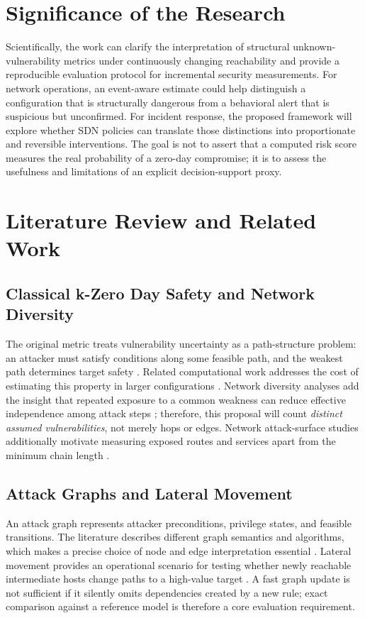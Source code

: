 \documentclass[12pt,a4paper,oneside]{article}
\begin{document}
\section{Significance of the Research}\label{sec:significance}
Scientifically, the work can clarify the interpretation of structural unknown-vulnerability metrics under continuously changing reachability and provide a reproducible evaluation protocol for incremental security measurements. For network operations, an event-aware estimate could help distinguish a configuration that is structurally dangerous from a behavioral alert that is suspicious but unconfirmed. For incident response, the proposed framework will explore whether SDN policies can translate those distinctions into proportionate and reversible interventions. The goal is not to assert that a computed risk score measures the real probability of a zero-day compromise; it is to assess the usefulness and limitations of an explicit decision-support proxy.

\section{Literature Review and Related Work}\label{sec:literature}
\subsection{Classical k-Zero Day Safety and Network Diversity}
The original metric treats vulnerability uncertainty as a path-structure problem: an attacker must satisfy conditions along some feasible path, and the weakest path determines target safety \cite{wang2010kzero,wang2014kzero}. Related computational work addresses the cost of estimating this property in larger configurations \cite{albanese2013efficient,wang2017resilience}. Network diversity analyses add the insight that repeated exposure to a common weakness can reduce effective independence among attack steps \cite{zhang2016diversity}; therefore, this proposal will count \emph{distinct assumed vulnerabilities}, not merely hops or edges. Network attack-surface studies additionally motivate measuring exposed routes and services apart from the minimum chain length \cite{zhang2021surface,manadhata2011surface}.

\subsection{Attack Graphs and Lateral Movement}
An attack graph represents attacker preconditions, privilege states, and feasible transitions. The literature describes different graph semantics and algorithms, which makes a precise choice of node and edge interpretation essential \cite{zenitani2023attack,lallie2020review}. Lateral movement provides an operational scenario for testing whether newly reachable intermediate hosts change paths to a high-value target \cite{smiliotopoulos2024lateral}. A fast graph update is not sufficient if it silently omits dependencies created by a new rule; exact comparison against a reference model is therefore a core evaluation requirement.
\end{document}
